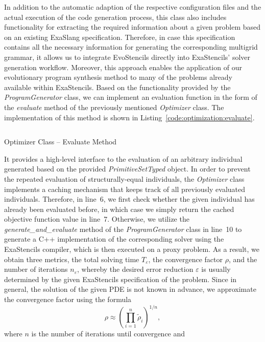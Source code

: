 In addition to the automatic adaption of the respective configuration files and the actual execution of the code generation process, this class also includes functionality for extracting the required information about a given problem based on an existing ExaSlang specification. 
Therefore, in case this specification contains all the necessary information for generating the corresponding multigrid grammar, it allows us to integrate EvoStencils directly into ExaStencils' solver generation workflow.
Moreover, this approach enables the application of our evolutionary program synthesis method to many of the problems already available within ExaStencils.
Based on the functionality provided by the \emph{ProgramGenerator} class, we can implement an evaluation function in the form of the \emph{evaluate} method of the previously mentioned \emph{Optimizer} class.
The implementation of this method is shown in Listing~\ref{code:optimization:evaluate}.
\begin{listing}
	\inputminted[linenos]{python}{evostencils/optimization/evaluate.py}
	\caption{Optimizer Class -- Evaluate Method}
	\label{code:optimization:evaluate}
\end{listing}
It provides a high-level interface to the evaluation of an arbitrary individual generated based on the provided \emph{PrimitiveSetTyped} object.
In order to prevent the repeated evaluation of structurally-equal individuals, the \emph{Optimizer} class implements a caching mechanism that keeps track of all previously evaluated individuals.
Therefore, in line~6, we first check whether the given individual has already been evaluated before, in which case we simply return the cached objective function value in line~7.
Otherwise, we utilize the \emph{generate\_and\_evaluate} method of the \emph{ProgramGenerator} class in line~10 to generate a C++ implementation of the corresponding solver using the ExaStencils compiler, which is then executed on a proxy problem.
As a result, we obtain three metrics, the total solving time $T_\varepsilon$, the convergence factor $\rho$, and the number of iterations $n_\varepsilon$, whereby the desired error reduction $\varepsilon$ is usually determined by the given ExaStencils specification of the problem.
Since in general, the solution of the given PDE is not known in advance, we approximate the convergence factor using the formula
\begin{equation}\label{eq:asymptotic_convergence_factor}
	\rho \approx \left(\prod_{i=1}^{n}\tilde{\rho}_i \right)^{1/n},
\end{equation} where $n$ is the number of iterations until convergence and
